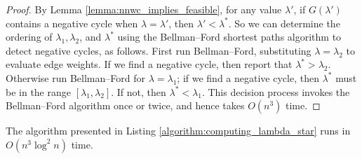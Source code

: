 \documentclass{llncs}
\begin{document}
\begin{proof}
By Lemma \ref{lemma:nnwc_implies_feasible}, for any value $\lambda'$, if $G(\lambda')$ contains a negative cycle when $\lambda=\lambda'$, then $\lambda'<\lambda^*$.  So we can determine the ordering of $\lambda_1, \lambda_2$, and $\lambda^*$ using the Bellman--Ford shortest paths algorithm \cite{bellman1958,ford1962} to detect negative cycles, as follows.  First run Bellman--Ford, substituting $\lambda=\lambda_2$ to evaluate edge weights.  If we find a negative cycle, then report that $\lambda^* > \lambda_2$.  Otherwise run Bellman--Ford for $\lambda=\lambda_1$; if we find a negative cycle, then $\lambda^*$ must be in the range $[\lambda_1, \lambda_2]$.  If not, then $\lambda^* < \lambda_1$.  This decision process invokes the Bellman--Ford algorithm once or twice, and hence takes $O(n^3)$ time.
\end{proof}

\begin{lemma}
\label{lemma:lambda_star_time}
The algorithm presented in Listing \ref{algorithm:computing_lambda_star} runs in $O(n^3 \log^2 n)$ time.
\end{lemma}
\end{document}
